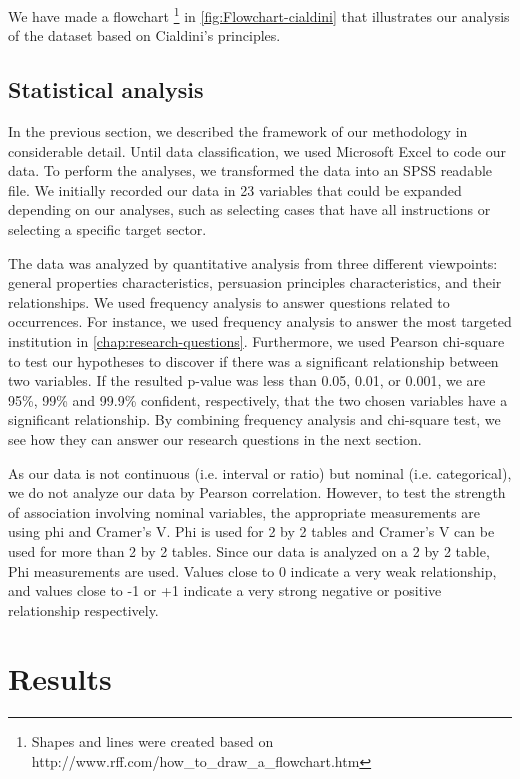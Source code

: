 We have made a flowchart%
\footnote{Shapes and lines were created based on http://www.rff.com/how\_to\_draw\_a\_flowchart.htm%
} in \autoref{fig:Flowchart-cialdini} that illustrates our analysis
of the dataset based on Cialdini's principles. 


\subsection{Statistical analysis}

In the previous section, we described the framework of our methodology
in considerable detail. Until data classification, we used Microsoft
Excel to code our data. To perform the analyses, we transformed the
data into an SPSS readable file. We initially recorded our data in
23 variables that could be expanded depending on our analyses, such
as selecting cases that have all instructions or selecting a specific
target sector.

The data was analyzed by quantitative analysis from three different
viewpoints: general properties characteristics, persuasion principles
characteristics, and their relationships. We used frequency analysis
to answer questions related to occurrences. For instance, we used
frequency analysis to answer the most targeted institution in \autoref{chap:research-questions}.
Furthermore, we used Pearson chi-square to test our hypotheses to
discover if there was a significant relationship between two variables.
If the resulted p-value was less than 0.05, 0.01, or 0.001, we are
95\%, 99\% and 99.9\% confident, respectively, that the two chosen
variables have a significant relationship. By combining frequency
analysis and chi-square test, we see how they can answer our research
questions in the next section. 

As our data is not continuous (i.e. interval or ratio) but nominal
(i.e. categorical), we do not analyze our data by Pearson correlation.
However, to test the strength of association involving nominal variables,
the appropriate measurements are using phi and Cramer\textquoteright s
V. Phi is used for 2 by 2 tables and Cramer\textquoteright s V can
be used for more than 2 by 2 tables. Since our data is analyzed on
a 2 by 2 table, Phi measurements are used. Values close to 0 indicate
a very weak relationship, and values close to -1 or +1 indicate a
very strong negative or positive relationship respectively.


\section{Results}

